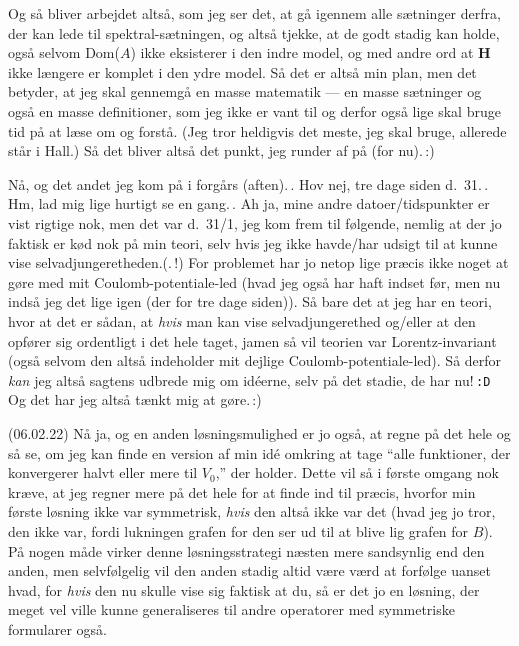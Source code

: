 \documentclass{report}
\begin{document}
Og så bliver arbejdet altså, som jeg ser det, at gå igennem alle sætninger derfra, der kan lede til spektral-sætningen, og altså tjekke, at de godt stadig kan holde, også selvom Dom($A$) ikke eksisterer i den indre model, og med andre ord at \textbf{H} ikke længere er komplet i den ydre model. Så det er altså min plan, men det betyder, at jeg skal gennemgå en masse matematik --- en masse sætninger og også en masse definitioner, som jeg ikke er vant til og derfor også lige skal bruge tid på at læse om og forstå. (Jeg tror heldigvis det meste, jeg skal bruge, allerede står i Hall.) Så det bliver altså det punkt, jeg runder af på (for nu).\,:) 

Nå, og det andet jeg kom på i forgårs (aften).\,. Hov nej, tre dage siden d.\ 31.\,. Hm, lad mig lige hurtigt se en gang.\,. Ah ja, mine andre datoer/tidspunkter er vist rigtige nok, men det var d.\ 31/1, jeg kom frem til følgende, nemlig at der jo faktisk er kød nok på min teori, selv hvis jeg ikke havde/har udsigt til at kunne vise selvadjungeretheden.(.\,!) For problemet har jo netop lige præcis ikke noget at gøre med mit Coulomb-potentiale-led (hvad jeg også har haft indset før, men nu indså jeg det lige igen (der for tre dage siden)). Så bare det at jeg har en teori, hvor at det er sådan, at \emph{hvis} man kan vise selvadjungerethed og/eller at den opfører sig ordentligt i det hele taget, jamen så vil teorien var Lorentz-invariant (også selvom den altså indeholder mit dejlige Coulomb-potentiale-led). Så derfor \emph{kan} jeg altså sagtens udbrede mig om idéerne, selv på det stadie, de har nu!\,\texttt{:D}\,\, Og det har jeg altså tænkt mig at gøre.\,:) 

(06.02.22) Nå ja, og en anden løsningsmulighed er jo også, at regne på det hele og så se, om jeg kan finde en version af min idé omkring at tage ``alle funktioner, der konvergerer halvt eller mere til $V_0$,'' der holder. Dette vil så i første omgang nok kræve, at jeg regner mere på det hele for at finde ind til præcis, hvorfor min første løsning ikke var symmetrisk, \emph{hvis} den altså ikke var det (hvad jeg jo tror, den ikke var, fordi lukningen grafen for den ser ud til at blive lig grafen for $B$). På nogen måde virker denne løsningsstrategi næsten mere sandsynlig end den anden, men selvfølgelig vil den anden stadig altid være værd at forfølge uanset hvad, for \emph{hvis} den nu skulle vise sig faktisk at du, så er det jo en løsning, der meget vel ville kunne generaliseres til andre operatorer med symmetriske formularer også. 
\end{document}
